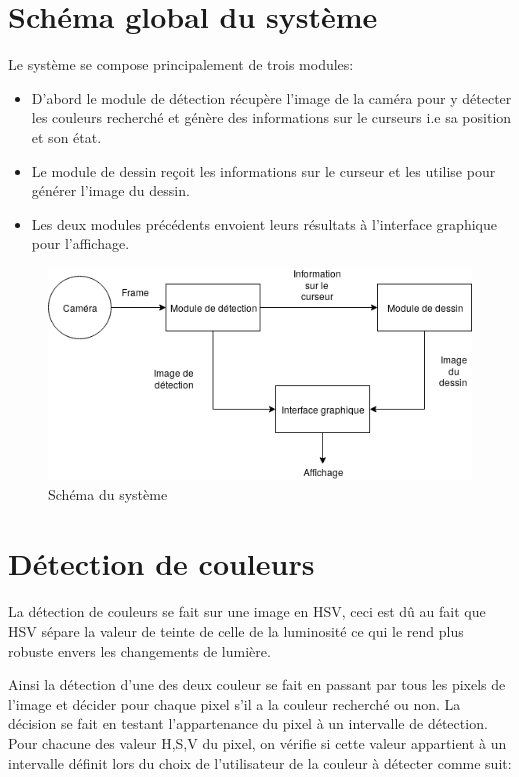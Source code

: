 \documentclass[12pt]{report}
\begin{document}
\section{Schéma global du système}
Le système se compose principalement de trois modules:

\begin{itemize}
	\item D’abord le module de détection récupère l’image de la caméra pour y détecter les couleurs recherché et génère des informations sur le curseurs i.e sa position et son état.
	
	\item Le module de dessin reçoit les informations sur le curseur et les utilise pour générer l’image du dessin.
	
	\item Les deux modules précédents envoient leurs résultats à l’interface graphique pour l’affichage.
\end{itemize}

\begin{figure}[H]
	\centering
	\includegraphics[scale=0.75]{imgs/MainDiagram.png}
	\caption{Schéma du système}
	\label{fig:SchemaGlob}
\end{figure}

\section{Détection de couleurs}
\paragraph{}La détection de couleurs se fait sur une image en HSV, ceci est dû au fait que HSV sépare la valeur de teinte de celle de la luminosité ce qui le rend plus robuste envers les changements de lumière. 

Ainsi la détection d’une des deux couleur se fait en passant par tous les pixels de l’image et décider pour chaque pixel s’il a la couleur recherché ou non. La décision se fait en testant l’appartenance du pixel à un intervalle de détection. Pour chacune des valeur H,S,V du pixel, on vérifie si cette valeur appartient à un intervalle définit lors du choix de l’utilisateur de la couleur à détecter comme suit: 
\end{document}
